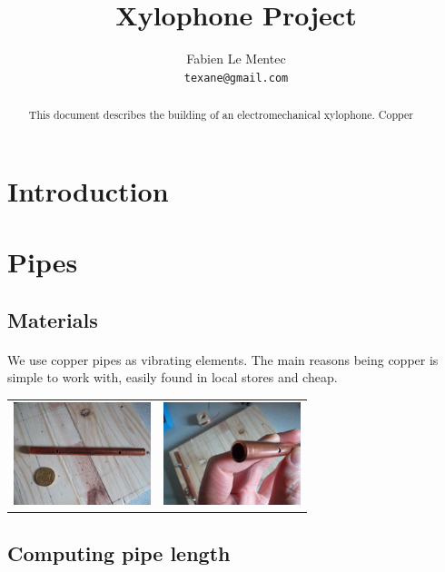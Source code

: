 \documentclass[12pt]{article}
\title{Xylophone Project}
\author{Fabien Le Mentec\\
\small \texttt{texane@gmail.com}
}
\date{}
\begin{document}
\maketitle

\newpage
\begin{abstract}
This document describes the building of an electromechanical xylophone.
Copper
\end{abstract}

\newpage
\section{Introduction}


\newpage
\section{Pipes}

\subsection{Materials}
\paragraph{} We use copper pipes as vibrating elements. The main reasons being
copper is simple to work with, easily found in local stores and cheap.
\begin{center}
  \begin{tabular}{c|c}
    \includegraphics[keepaspectratio=true, width=40mm]{../pics/copper_pipe/full_scaled.jpg} &
    \includegraphics[keepaspectratio=true, width=40mm]{../pics/copper_pipe/inner_scaled.jpg}
  \end{tabular}
\end{center}

\subsection{Computing pipe length}
\end{document}
